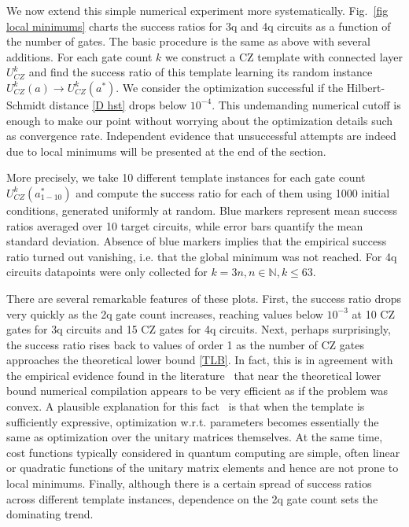 \documentclass[twocolumn, amsfonts, amssymb, aps, nofootinbib]{revtex4-2}
\newcommand{\CZ}{\textsf{CZ }}
\begin{document}
We now extend this simple numerical experiment more systematically. Fig.~\ref{fig local minimums} charts the success ratios for 3q and 4q circuits as a function of the number of gates. The basic procedure is the same as above with several additions. For each gate count $k$ we construct a \CZ template with connected layer $U^k_{CZ}$ and find the success ratio of this template learning its random instance $U^k_{CZ}(a)\to U^k_{CZ}(a^*)$. We consider the optimization successful if the Hilbert-Schmidt distance \eqref{D hst} drops below $10^{-4}$. This undemanding numerical cutoff is enough to make our point without worrying about the optimization details such as convergence rate. Independent evidence that unsuccessful attempts are indeed due to local minimums will be presented at the end of the section.

More precisely, we take 10 different template instances for each gate count $U^k_{CZ}(a^*_{1-10})$ and compute the success ratio for each of them using 1000 initial conditions, generated uniformly at random. Blue markers represent mean success ratios averaged over 10 target circuits, while error bars quantify the mean standard deviation. Absence of blue markers implies that the empirical success ratio turned out vanishing, i.e. that the global minimum was not reached. For 4q circuits datapoints were only collected for $k=3n, n\in\mathbb{N}, k\le 63$.

There are several remarkable features of these plots. First, the success ratio drops very quickly as the 2q gate count increases, reaching values below $10^{-3}$ at 10 \CZ gates for 3q circuits and 15 \CZ gates for 4q circuits. Next, perhaps surprisingly, the success ratio rises back to values of order 1 as the number of \CZ gates approaches the theoretical lower bound \eqref{TLB}. In fact, this is in agreement with the empirical evidence found in the literature~\cite{Madden2021, Rakyta2021, Kiani2020} that near the theoretical lower bound numerical compilation appears to be very efficient as if the problem was convex. A plausible explanation for this fact~\cite{Ge2022} is that when the template is sufficiently expressive, optimization w.r.t. parameters becomes essentially the same as optimization over the unitary matrices themselves. At the same time, cost functions typically considered in quantum computing are simple, often linear or quadratic functions of the unitary matrix elements and hence are not prone to local minimums. Finally, although there is a certain spread of success ratios across different template instances, dependence on the 2q gate count sets the dominating trend.
\end{document}
